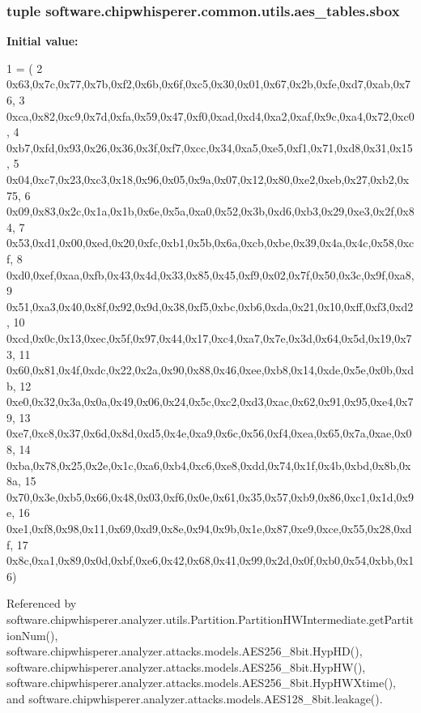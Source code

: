 \subsubsection[{sbox}]{\setlength{\rightskip}{0pt plus 5cm}tuple software.\+chipwhisperer.\+common.\+utils.\+aes\+\_\+tables.\+sbox}\label{namespacesoftware_1_1chipwhisperer_1_1common_1_1utils_1_1aes__tables_ab29ec75e9f1c27e4d0e14aa03b1558ba}
{\bfseries Initial value\+:}
\begin{DoxyCode}
1 = (
2 0x63,0x7c,0x77,0x7b,0xf2,0x6b,0x6f,0xc5,0x30,0x01,0x67,0x2b,0xfe,0xd7,0xab,0x76,
3 0xca,0x82,0xc9,0x7d,0xfa,0x59,0x47,0xf0,0xad,0xd4,0xa2,0xaf,0x9c,0xa4,0x72,0xc0,
4 0xb7,0xfd,0x93,0x26,0x36,0x3f,0xf7,0xcc,0x34,0xa5,0xe5,0xf1,0x71,0xd8,0x31,0x15,
5 0x04,0xc7,0x23,0xc3,0x18,0x96,0x05,0x9a,0x07,0x12,0x80,0xe2,0xeb,0x27,0xb2,0x75,
6 0x09,0x83,0x2c,0x1a,0x1b,0x6e,0x5a,0xa0,0x52,0x3b,0xd6,0xb3,0x29,0xe3,0x2f,0x84,
7 0x53,0xd1,0x00,0xed,0x20,0xfc,0xb1,0x5b,0x6a,0xcb,0xbe,0x39,0x4a,0x4c,0x58,0xcf,
8 0xd0,0xef,0xaa,0xfb,0x43,0x4d,0x33,0x85,0x45,0xf9,0x02,0x7f,0x50,0x3c,0x9f,0xa8,
9 0x51,0xa3,0x40,0x8f,0x92,0x9d,0x38,0xf5,0xbc,0xb6,0xda,0x21,0x10,0xff,0xf3,0xd2,
10 0xcd,0x0c,0x13,0xec,0x5f,0x97,0x44,0x17,0xc4,0xa7,0x7e,0x3d,0x64,0x5d,0x19,0x73,
11 0x60,0x81,0x4f,0xdc,0x22,0x2a,0x90,0x88,0x46,0xee,0xb8,0x14,0xde,0x5e,0x0b,0xdb,
12 0xe0,0x32,0x3a,0x0a,0x49,0x06,0x24,0x5c,0xc2,0xd3,0xac,0x62,0x91,0x95,0xe4,0x79,
13 0xe7,0xc8,0x37,0x6d,0x8d,0xd5,0x4e,0xa9,0x6c,0x56,0xf4,0xea,0x65,0x7a,0xae,0x08,
14 0xba,0x78,0x25,0x2e,0x1c,0xa6,0xb4,0xc6,0xe8,0xdd,0x74,0x1f,0x4b,0xbd,0x8b,0x8a,
15 0x70,0x3e,0xb5,0x66,0x48,0x03,0xf6,0x0e,0x61,0x35,0x57,0xb9,0x86,0xc1,0x1d,0x9e,
16 0xe1,0xf8,0x98,0x11,0x69,0xd9,0x8e,0x94,0x9b,0x1e,0x87,0xe9,0xce,0x55,0x28,0xdf,
17 0x8c,0xa1,0x89,0x0d,0xbf,0xe6,0x42,0x68,0x41,0x99,0x2d,0x0f,0xb0,0x54,0xbb,0x16)
\end{DoxyCode}


Referenced by software.\+chipwhisperer.\+analyzer.\+utils.\+Partition.\+Partition\+H\+W\+Intermediate.\+get\+Partition\+Num(), software.\+chipwhisperer.\+analyzer.\+attacks.\+models.\+A\+E\+S256\+\_\+8bit.\+Hyp\+H\+D(), software.\+chipwhisperer.\+analyzer.\+attacks.\+models.\+A\+E\+S256\+\_\+8bit.\+Hyp\+H\+W(), software.\+chipwhisperer.\+analyzer.\+attacks.\+models.\+A\+E\+S256\+\_\+8bit.\+Hyp\+H\+W\+Xtime(), and software.\+chipwhisperer.\+analyzer.\+attacks.\+models.\+A\+E\+S128\+\_\+8bit.\+leakage().

